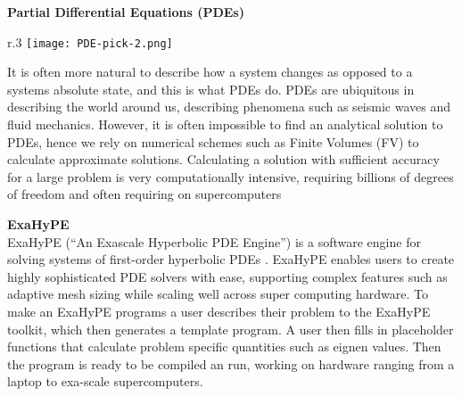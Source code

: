 \textbf{Partial Differential Equations (PDEs)}\\
\begin{wrapfigure}{r}{.3\textwidth}
        \texttt{[image: PDE-pick-2.png]}
\end{wrapfigure}
It is often more natural to describe how a system changes as opposed to a systems absolute state, and this is what PDEs do.
PDEs are ubiquitous in describing the world around us, describing 
phenomena such as seismic waves and fluid mechanics.
However, it is often impossible to find an analytical solution to PDEs, hence we rely 
on numerical schemes such as Finite Volumes (FV) to calculate approximate 
solutions.
Calculating a solution with sufficient accuracy for a large problem is very computationally intensive, requiring billions of degrees of freedom and often requiring on supercomputers

\phantom{ }

\textbf{ExaHyPE}\\
ExaHyPE (``An Exascale Hyperbolic PDE Engine'') is a software engine for solving systems of first-order hyperbolic PDEs \cite{exahype}.
ExaHyPE enables users to create highly sophisticated PDE solvers with ease, 
supporting complex features such as adaptive mesh sizing while scaling well across 
super computing hardware.
To make an ExaHyPE programs a user describes their problem to the ExaHyPE toolkit, which then generates a template program.
A user then fills in placeholder functions that calculate problem specific quantities such as eignen values.
Then the program is ready to be compiled an run, working on hardware ranging from a laptop to exa-scale supercomputers.



